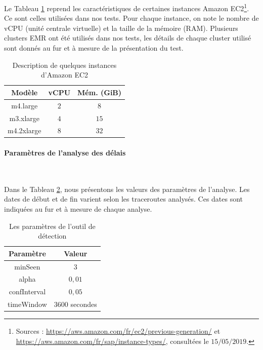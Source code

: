 Le Tableau \ref{instances-types-description} reprend  les caractéristiques de certaines instances Amazon EC2\footnote{Sources : \url{https://aws.amazon.com/fr/ec2/previous-generation/} et \url{https://aws.amazon.com/fr/sap/instance-types/}, consultées le $15/05/2019$.}. Ce sont celles utilisées dans nos tests. Pour chaque instance, on note le nombre de vCPU (unité centrale virtuelle) et la taille de la mémoire (RAM). Plusieurs clusters EMR ont été utilisés dans nos tests, les détails de chaque  cluster utilisé sont donnés au fur et à mesure de la présentation du test.
\begin{table}[H]
	\centering
	\begin{tabular}{c c c}
		\hline 
		\textbf{Modèle} &	\textbf{vCPU} &\textbf{	Mém. (GiB)} \\ 
		\hline 
		m4.large&	$ 2 $&	$ 8 $ \\
		\hline 
		m3.xlarge&	$ 4 $&	$ 15 $\\
		\hline 
		m4.2xlarge&	$8  $&	$ 32 $ \\ 
		\hline 
	\end{tabular}
	\caption{Description de quelques instances d'Amazon EC2}
	\label{instances-types-description}
\end{table}

\paragraph{Paramètres de l'analyse des délais}~

 Dans le Tableau \ref{params-detection}, nous présentons les valeurs des paramètres de l'analyse. Les dates de début et de fin  varient selon les traceroutes analysés. Ces dates sont indiquées au fur et à mesure de chaque analyse.

\begin{table}[h]
	\centering
	\begin{tabular}{c c }
		\hline 
	\textbf{Paramètre}	& \textbf{Valeur}  \\ 
		\hline 
	minSeen	& $ 3 $ \\ 
		\hline 
	alpha	&  $ 0,01 $\\ 
		\hline 
	confInterval	& $0,05$ \\ 
		\hline 
	timeWindow	&  $ 3600 $ secondes \\ 
		\hline 
	\end{tabular} 
\caption{Les paramètres  de l'outil de détection}
\label{params-detection}
\end{table}



